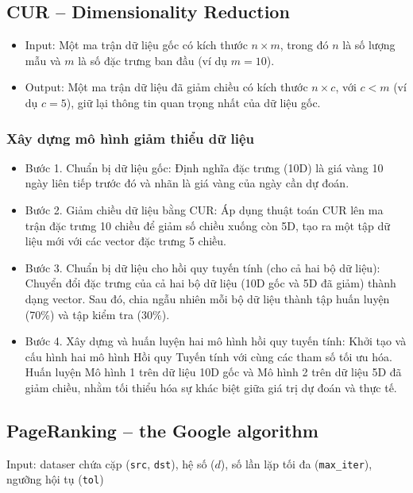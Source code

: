 \documentclass[conference]{IEEEtran}
\begin{document}
\subsection{CUR – Dimensionality Reduction}
\begin{itemize}
    \item Input: Một ma trận dữ liệu gốc có kích thước $n \times m$, trong đó $n$ là số lượng mẫu và $m$ là số đặc trưng ban đầu (ví dụ $m=10$).
    \item Output: Một ma trận dữ liệu đã giảm chiều có kích thước $n \times c$, với $c < m$ (ví dụ $c=5$), giữ lại thông tin quan trọng nhất của dữ liệu gốc.
\end{itemize}
\subsubsection*{Xây dựng mô hình giảm thiểu dữ liệu}
\begin{itemize}
    \item Bước 1. Chuẩn bị dữ liệu gốc: Định nghĩa đặc trưng (10D) là giá vàng 10 ngày liên tiếp trước đó và nhãn là giá vàng của ngày cần dự đoán.

    \item Bước 2. Giảm chiều dữ liệu bằng CUR: Áp dụng thuật toán CUR lên ma trận đặc trưng 10 chiều để giảm số chiều xuống còn 5D, tạo ra một tập dữ liệu mới với các vector đặc trưng 5 chiều.

    \item Bước 3. Chuẩn bị dữ liệu cho hồi quy tuyến tính (cho cả hai bộ dữ liệu): Chuyển đổi đặc trưng của cả hai bộ dữ liệu (10D gốc và 5D đã giảm) thành dạng vector. Sau đó, chia ngẫu nhiên mỗi bộ dữ liệu thành tập huấn luyện (70\%) và tập kiểm tra (30\%).

    \item Bước 4. Xây dựng và huấn luyện hai mô hình hồi quy tuyến tính: Khởi tạo và cấu hình hai mô hình Hồi quy Tuyến tính với cùng các tham số tối ưu hóa. Huấn luyện Mô hình 1 trên dữ liệu 10D gốc và Mô hình 2 trên dữ liệu 5D đã giảm chiều, nhằm tối thiểu hóa sự khác biệt giữa giá trị dự đoán và thực tế.
\end{itemize}

\subsection{PageRanking – the Google algorithm}
Input: dataser chứa cặp (\texttt{src}, \texttt{dst}), hệ số ($d$), số lần lặp tối đa (\texttt{max\_iter}), ngưỡng hội tụ (\texttt{tol})
\end{document}
